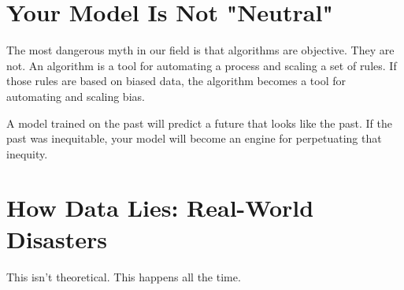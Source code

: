 \documentclass[11pt, letterpaper, openany]{book}
\begin{document}
\section{Your Model Is Not "Neutral"}

The most dangerous myth in our field is that algorithms are objective. They are not. An algorithm is a tool for automating a process and scaling a set of rules. If those rules are based on biased data, the algorithm becomes a tool for automating and scaling bias.

A model trained on the past will predict a future that looks like the past. If the past was inequitable, your model will become an engine for perpetuating that inequity.

\section{How Data Lies: Real-World Disasters}

This isn't theoretical. This happens all the time.
\end{document}

